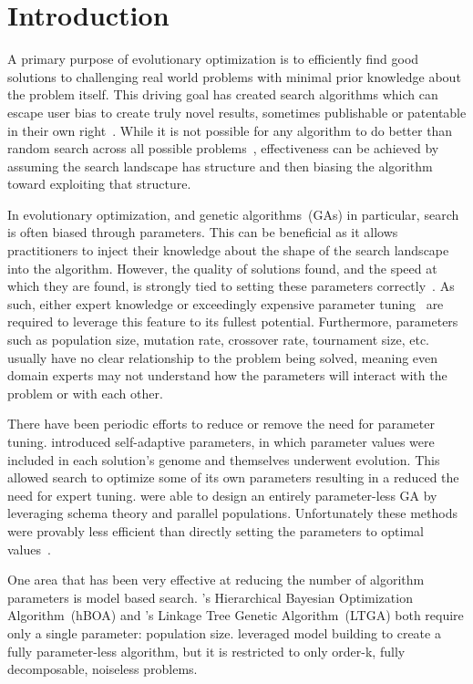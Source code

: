 \chapter{Introduction}
\label{chap-introduction}
A primary purpose of evolutionary optimization is to efficiently find good solutions
to challenging real world problems with minimal prior knowledge about the problem itself.
This driving goal has created search algorithms which can escape user bias to create
truly novel results, sometimes publishable or patentable in their own right~\cite{kannappan:2014:humies}.
While it is not possible for any algorithm to do better than random search across all possible
problems~\cite{Wolpert:1997:nfl}, effectiveness can be achieved by assuming the search
landscape has structure and then biasing the algorithm toward exploiting that structure.

In evolutionary optimization, and genetic algorithms~(GAs) in particular, search is often
biased through parameters. This can be beneficial as it allows practitioners to inject their
knowledge about the shape of the search landscape into the algorithm.
However, the quality of solutions found, and the speed at which they are found, is strongly tied to setting these parameters
correctly~\cite{goldberg:1991:gasize}. As such, either expert knowledge or exceedingly
expensive parameter tuning~\cite{grefenstette:1986:optimalga} are required to leverage
this feature to its fullest potential. Furthermore,  parameters such as population size, mutation rate, crossover
rate, tournament size, etc. usually have no clear relationship to the problem being solved, meaning even
domain experts may not understand how the parameters will interact with the problem or with each other.

There have been periodic efforts to reduce or remove the need for parameter tuning.
\cite{Back:1992:selfadapt} introduced self-adaptive parameters, in which parameter values
were included in each solution's genome and themselves underwent evolution. This allowed search
to optimize some of its own parameters resulting in a reduced the need for expert tuning.
\cite{harik:1999:parameterlessga} were able to design an entirely parameter-less GA by
leveraging schema theory and parallel populations. Unfortunately these methods were provably less efficient
than directly setting the parameters to optimal values~\cite{pelikan:1999:worstparameter-less}.

One area that has been very effective at reducing the number of algorithm parameters is
model based search. \cite{pelikan:2006:hboa}'s Hierarchical Bayesian Optimization
Algorithm~(hBOA) and \cite{thierens:2010:ltga}'s Linkage Tree Genetic Algorithm~(LTGA)
both require only a single parameter: population size. \cite{posik:2011:parameterless}
leveraged model building to create a fully parameter-less algorithm, but it is restricted to
only order-k, fully decomposable, noiseless problems.

